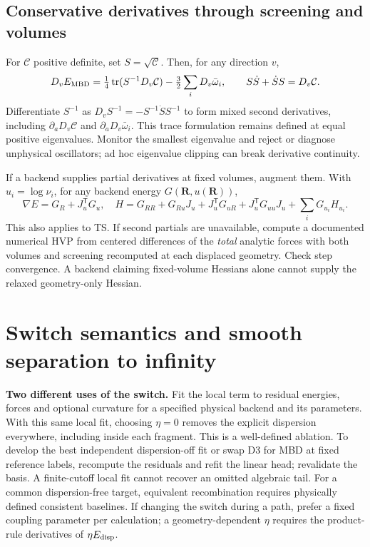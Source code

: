 \documentclass[11pt,a4paper]{article}
\newcommand{\T}{\mathsf T}\newcommand{\tr}{\operatorname{tr}}
\newcommand{\D}{\partial}\newcommand{\alg}[1]{\par\smallskip{\sffamily\bfseries\color{tealblue}#1}\par\nobreak}
\begin{document}
\subsection{Conservative derivatives through screening and volumes}
For $\mathcal C$ positive definite, set $S=\sqrt{\mathcal C}$. Then, for any direction $v$,
\[
 D_vE_{\rm MBD}=\tfrac14\tr(S^{-1}D_v\mathcal C)-\tfrac32\sum_iD_v\bar\omega_i,
 \qquad S\dot S+\dot S S=D_v\mathcal C .
\]
Differentiate $S^{-1}$ as $D_vS^{-1}=-S^{-1}\dot S S^{-1}$ to form mixed second derivatives, including $\D_a D_v\mathcal C$ and $\D_aD_v\bar\omega_i$. This trace formulation remains defined at equal positive eigenvalues. Monitor the smallest eigenvalue and reject or diagnose unphysical oscillators; ad hoc eigenvalue clipping can break derivative continuity.

If a backend supplies partial derivatives at fixed volumes, augment them. With $u_i=\log\nu_i$, for any backend energy $G(\mathbf R,u(\mathbf R))$,
\[
 \nabla E=G_R+J_u^\T G_u,\quad
 H=G_{RR}+G_{Ru}J_u+J_u^\T G_{uR}+J_u^\T G_{uu}J_u+
             \sum_i G_{u_i}H_{u_i}.
\]
This also applies to TS. If second partials are unavailable, compute a documented numerical HVP from centered differences of the \emph{total} analytic forces with both volumes and screening recomputed at each displaced geometry. Check step convergence. A backend claiming fixed-volume Hessians alone cannot supply the relaxed geometry-only Hessian.

\pg\section{Switch semantics and smooth separation to infinity}
\textbf{Two different uses of the switch.} Fit the local term to residual energies, forces and optional curvature for a specified physical backend and its parameters. With this same local fit, choosing $\eta=0$ removes the explicit dispersion everywhere, including inside each fragment. This is a well-defined ablation. To develop the best independent dispersion-off fit or swap D3 for MBD at fixed reference labels, recompute the residuals and refit the linear head; revalidate the basis. A finite-cutoff local fit cannot recover an omitted algebraic tail. For a common dispersion-free target, equivalent recombination requires physically defined consistent baselines. If changing the switch during a path, prefer a fixed coupling parameter per calculation; a geometry-dependent $\eta$ requires the product-rule derivatives of $\eta E_{\rm disp}$.
\end{document}
